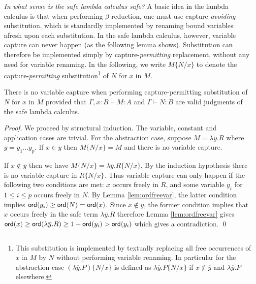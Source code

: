 \documentclass{llncs}
\newcommand\captsubst[2]{\{#1/#2 \}}
\newcommand\ord[1]{{\sf
    ord}(#1)} \newcommand\typear{\rightarrow}
\begin{document}
\emph{In what sense is the safe lambda calculus safe?} A basic idea
in the lambda calculus is that when performing $\beta$-reduction, one
must use capture-\emph{avoiding} substitution, which is standardly
implemented by renaming bound variables afresh upon each substitution.
In the safe lambda calculus, however, variable capture can never
happen (as the following lemma shows). Substitution can therefore be
implemented simply by capture-\emph{permitting} replacement, without
any need for variable renaming. In the following, we write
$M\captsubst{N}{x}$ to denote the capture-\emph{permitting}
substitution\footnote{This substitution is implemented by textually
  replacing all free occurrences of $x$ in $M$ by $N$ without
  performing variable renaming.  In particular for the abstraction
  case $(\lambda \overline{y} . P)\captsubst{N}{x}$ is defined as
  $\lambda \overline{y} . P\captsubst{N}{x}$ if $x\not\in
  \overline{y}$ and $\lambda \overline{y} . P$ elsewhere.} of $N$ for
$x$ in $M$.

\begin{lemma}\label{lem:nvc}
\label{lem:homog_nocapture} There is
no variable capture when performing capture-permitting
substitution of $N$ for $x$ in $M$
provided that $\Gamma, x:B \vdash M : A$ and $\Gamma \vdash  N : B$ are valid judgments of the safe lambda calculus.
\end{lemma}

\begin{proof}
  We proceed by structural induction. The variable, constant and
  application cases are trivial. For the abstraction case, suppose $M = \lambda \overline{y}. R$ where $\overline{y} = y_1
  \ldots y_p$. If $x \in \overline{y}$ then $M \captsubst{N}{x} = M$ and there is no variable capture.

 If $x \not\in \overline{y}$ then we have $M \captsubst{N}{x} = \lambda \overline{y} . R \captsubst{N}{x}$.  By the induction hypothesis there is no variable capture in $R \captsubst{N}{x}$.  Thus variable capture can only happen if the following two conditions are met: $x$ occurs freely in $R$, and some variable $y_i$ for $1 \leq i \leq p$ occurs freely in $N$. By Lemma \ref{lem:ordfreevar}, the latter condition  implies $\ord{y_i} \geq \ord{N} = \ord{x}$.  Since $x \not \in \overline{y}$, the former condition implies that $x$ occurs freely in the safe term $\lambda \overline{y}. R$
  therefore Lemma \ref{lem:ordfreevar} gives $ \ord{x} \geq
  \ord{\lambda \overline{y} . R} \geq 1+ \ord{y_i} > \ord{y_i}$ which  gives a contradiction. \qed
\end{proof}
\end{document}
